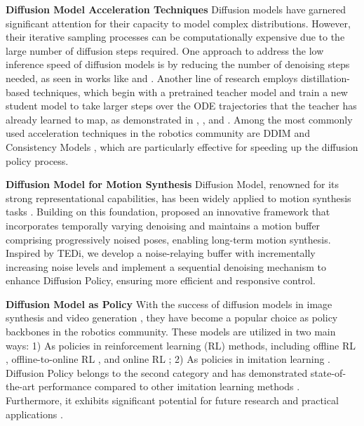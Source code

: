 \textbf{Diffusion Model Acceleration Techniques}  Diffusion models \citep{ho2020denoising} have garnered significant attention for their capacity to model complex distributions. However, their iterative sampling processes can be computationally expensive due to the large number of diffusion steps required. One approach to address the low inference speed of diffusion models is by reducing the number of denoising steps needed, as seen in works like \citep{song2020denoising} and \citep{karras2022elucidating}. Another line of research employs distillation-based techniques, which begin with a pretrained teacher model and train a new student model to take larger steps over the ODE trajectories that the teacher has already learned to map, as demonstrated in \citep{song2023consistency}, \citep{liu2023instaflow}, and \citep{salimans2022progressive}. Among the most commonly used acceleration techniques in the robotics community are DDIM \citep{song2020denoising} and Consistency Models \citep{song2023consistency}, which are particularly effective for speeding up the diffusion policy process.

\textbf{Diffusion Model for Motion Synthesis} Diffusion Model, renowned for its strong representational capabilities, has been widely applied to motion synthesis tasks \citep{shafir2023human}. Building on this foundation, \cite{zhang2024tedi} proposed an innovative framework that incorporates temporally varying denoising and maintains a motion buffer comprising progressively noised poses, enabling long-term motion synthesis. Inspired by TEDi, we develop a noise-relaying buffer with incrementally increasing noise levels and implement a sequential denoising mechanism to enhance Diffusion Policy, ensuring more efficient and responsive control.

\textbf{Diffusion Model as Policy} With the success of diffusion models in image synthesis and video generation \citep{ho2020denoising}, they have become a popular choice as policy backbones in the robotics community. These models are utilized in two main ways: 1) As policies in reinforcement learning (RL) methods, including offline RL \citep{wang2022diffusion,hansen2023idql,mao2024diffusion}, offline-to-online RL \citep{ding2023consistency}, and online RL \citep{yang2023policy}; 2) As policies in imitation learning \citep{chi2023diffusion,reuss2023goal}. Diffusion Policy belongs to the second category and has demonstrated state-of-the-art performance compared to other imitation learning methods \citep{shafiullah2022behavior,florence2022implicit,abramson1970aloha}. Furthermore, it exhibits significant potential for future research and practical applications \citep{yuan2024policy}.

